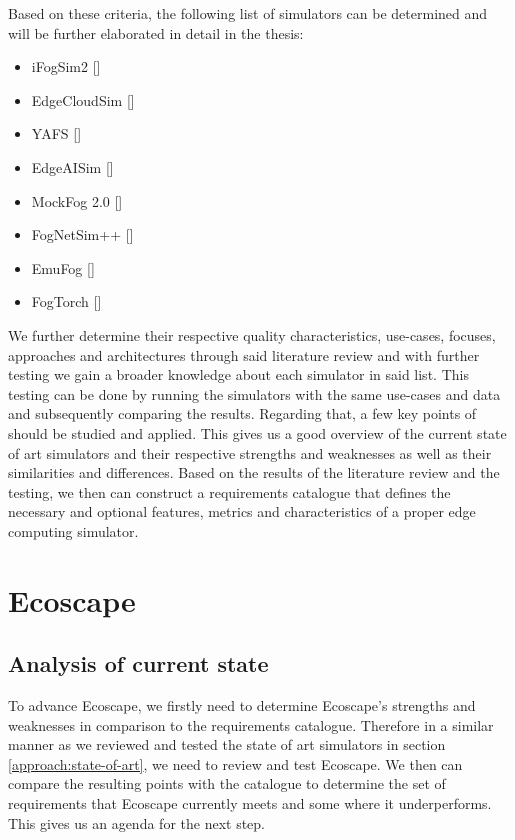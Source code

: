 Based on these criteria, the following list of simulators can be determined and will be further elaborated in detail in the thesis:
\begin{itemize}
  \item iFogSim2 [\cite{mahmud2021ifogsim2extendedifogsimsimulator}]
  \item EdgeCloudSim [\cite{https://doi.org/10.1002/ett.3493}]
  \item YAFS [\cite{8758823}]
  \item EdgeAISim [\cite{Nandhakumar_2024}]
  \item MockFog 2.0 [\cite{Hasenburg_2023}]
  \item FogNetSim++ [\cite{fognetsimplspls}]
  \item EmuFog [\cite{8368525}]
  \item FogTorch [\cite{7919155}]
\end{itemize}
We further determine their respective quality characteristics, use-cases, focuses, approaches and architectures through said literature review and with further testing we gain a broader knowledge about each simulator in said list.
This testing can be done by running the simulators with the same use-cases and data and subsequently comparing the results. Regarding that, a few key points of \cite{pfandzelter2024lessonslearnedbuildingedge} should be studied and applied.
This gives us a good overview of the current state of art simulators and their respective strengths and weaknesses as well as their similarities and differences.
Based on the results of the literature review and the testing, we then can construct a requirements catalogue that defines the necessary and optional features, metrics and characteristics of a proper edge computing simulator.

\section{Ecoscape}\label{approach:ecoscape}
\subsection{Analysis of current state}\label{approach:ecoscape-current-state}
To advance Ecoscape, we firstly need to determine Ecoscape's strengths and weaknesses in comparison to the requirements catalogue. 
Therefore in a similar manner as we reviewed and tested the state of art simulators in section \ref{approach:state-of-art}, we need to review and test Ecoscape.
We then can compare the resulting points with the catalogue to determine the set of requirements that Ecoscape currently meets and some where it underperforms.
This gives us an agenda for the next step.

